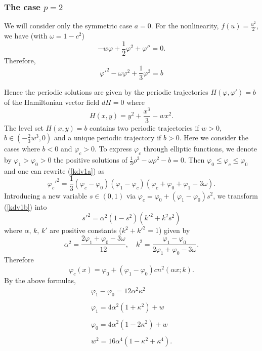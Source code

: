 \documentclass[final,11pt,leqno]{amsart}
\begin{document}
\subsubsection{The case $p=2$}
We will consider only the symmetric case $a=0$. For the nonlinearity,
 $f(u)=\frac{u^2}{2}$, we have (with $\omega=1-c^2$) 
\begin{equation}
\label{kdv1}
  -w\varphi+{\frac{1}{2}}\varphi^2+\varphi''=0.
\end{equation}
Therefore,
    \begin{equation}\label{kdv1a}
    \varphi'^2-\omega \varphi^2 +\frac13\varphi^3=b
   \end{equation}

Hence the periodic solutions are given by the periodic
trajectories $H(\varphi,\varphi')=b$ of the Hamiltonian vector
field $dH=0$ where
$$H(x,y)=y^2+{\frac{x^3}{3}}-wx^2.$$
The level set $H(x,y)=b$ contains  two periodic trajectories if
$w>0$, $b\in \left( -\frac{2}{3}w^3, 0\right)$ and a unique
periodic trajectory if $b>0$. Here we consider the cases where $b<0$ and
$\varphi_c>0$. To express $\varphi_c$ through elliptic functions,
we denote by $\varphi_1>\varphi_0>0$ the positive solutions of
$\frac13\rho^3-\omega \rho^2-b=0$. Then $\varphi_0\leq
\varphi_c\leq \varphi_0$ and one can rewrite (\ref{kdv1a}) as
\begin{equation}\label{kdv1b}
\varphi_c'^2=\frac13(\varphi_c-\varphi_0)(\varphi_1-\varphi_c)(\varphi_c+\varphi_0+\varphi_1-3\omega).
\end{equation}
Introducing a new variable $s\in(0,1)$ via
$\varphi_c=\varphi_0+(\varphi_1-\varphi_0)s^2$, we transform
(\ref{kdv1b}) into
$$s'^2=\alpha^2(1-s^2)(k'^2+k^2s^2)$$ where $\alpha$, $k$, $k'$
are positive constants ($k^2+k'^2=1$) given by
$$\alpha^2=\frac{2\varphi_1+\varphi_0-3\omega}{12}, \quad
k^2=\frac{\varphi_1-\varphi_0}{2\varphi_1+\varphi_0-3\omega}.$$
Therefore
\begin{equation}\label{kdv2}
\varphi_c(x)=\varphi_0+(\varphi_1-\varphi_0)cn^2(\alpha x;k).
\end{equation}
By the above formulas,
  \begin{equation}\label{kdv2a}
    \begin{array}{ll}
    \varphi_1-\varphi_0=12\alpha^2\kappa^2\\
    \\
    \varphi_1=4\alpha^2(1+\kappa^2)+w\\
    \\
    \varphi_0=4\alpha^2(1-2\kappa^2)+w\\
    \\
    w^2=16\alpha^4(1-\kappa^2+\kappa^4).
   \end{array}
   \end{equation}
\end{document}
